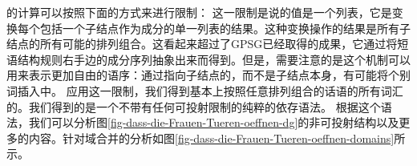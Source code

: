 \domvc 的计算可以按照下面的方式来进行限制：
\ea
{} \impl
{}
\z
这一限制是说\dom 的值是一个列表，它是变换每个包括一个子结点作为成分的单一列表的结果。这种变换操作的结果是所有子结点的所有可能的排列组合。这看起来超过了GPSG已经取得的成果，它通过将短语结构规则右手边的成分序列抽象出来而得到。但是，需要注意的是这个机制可以用来表示更加自由的语序：通过指向子结点的\domvsc，而不是子结点本身，有可能将个别词插入\domlc 中。
\ea
{} \impl
{}
\z
应用这一限制，我们得到基本上按照任意排列组合的话语的所有词汇的\domvsc。我们得到的是一个不带有任何可投射限制的纯粹的依存语法。
根据这个语法，我们可以分析图\vref{fig-dass-die-Frauen-Tueren-oeffnen-dg}的非可投射结构以及更多的内容。针对域合并的分析如图\vref{fig-dass-die-Frauen-Tueren-oeffnen-domains}所示。
